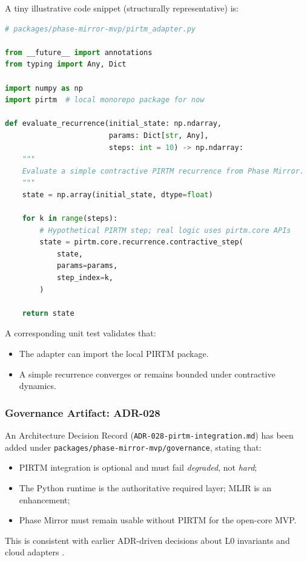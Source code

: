 \documentclass[11pt]{article}
\begin{document}
A tiny illustrative code snippet (structurally representative) is:

\begin{lstlisting}[style=code,language=Python]
# packages/phase-mirror-mvp/pirtm_adapter.py

from __future__ import annotations
from typing import Any, Dict

import numpy as np
import pirtm  # local monorepo package for now

def evaluate_recurrence(initial_state: np.ndarray,
                        params: Dict[str, Any],
                        steps: int = 10) -> np.ndarray:
    """
    Evaluate a simple contractive PIRTM recurrence from Phase Mirror.
    """
    state = np.array(initial_state, dtype=float)

    for k in range(steps):
        # Hypothetical PIRTM step; real logic uses pirtm.core APIs
        state = pirtm.core.recurrence.contractive_step(
            state,
            params=params,
            step_index=k,
        )

    return state
\end{lstlisting}

A corresponding unit test validates that:
\begin{itemize}
  \item The adapter can import the local PIRTM package.
  \item A simple recurrence converges or remains bounded under contractive dynamics.
\end{itemize}

\subsubsection{Governance Artifact: ADR-028}

An Architecture Decision Record (\texttt{ADR-028-pirtm-integration.md}) has been added under \texttt{packages/phase-mirror-mvp/governance}, stating that:
\begin{itemize}
  \item PIRTM integration is optional and must fail \emph{degraded}, not \emph{hard};
  \item The Python runtime is the authoritative required layer; MLIR is an enhancement;
  \item Phase Mirror must remain usable without PIRTM for the open-core MVP.
\end{itemize}

This is consistent with earlier ADR-driven decisions about L0 invariants and cloud adapters \cite{pm-phases0-3,pm-open-core-dev,pm-mvp-analysis}.
\end{document}
